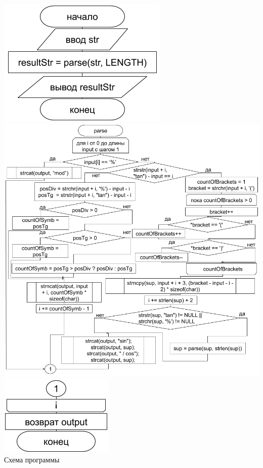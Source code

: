 \documentclass[a4paper,14pt]{extarticle}
\begin{document}
\begin{center}
\includegraphics[scale=0.6]{lab6-2.png}\\
\includegraphics[scale=0.6]{lab6-2-1.png}\\
\includegraphics[scale=0.6]{lab6-2-2.png}\\
Схема программы
\end{center}

\end{document}
